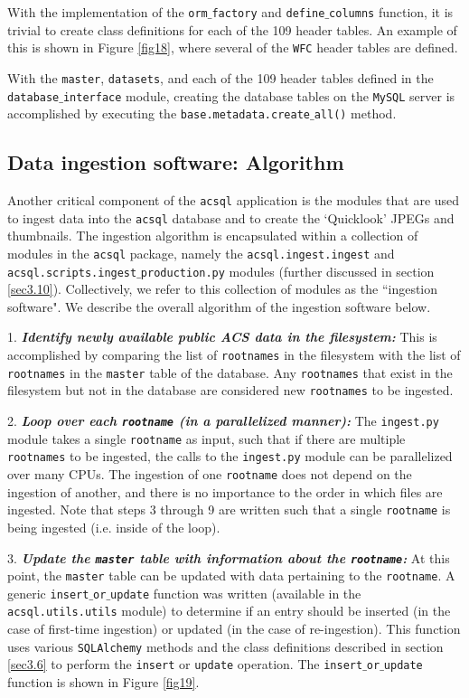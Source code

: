 \documentclass[10pt,journal,compsoc]{IEEEtran}
\begin{document}
With the implementation of the \texttt{orm$\_$factory} and \texttt{define$\_$columns} function, it is trivial to create class definitions for each of the 109 header tables.  An
example of this is shown in Figure \ref{fig18}, where several of the \texttt{WFC} header tables are defined.

With the \texttt{master}, \texttt{datasets}, and each of the 109 header tables defined in the \texttt{database$\_$interface} module, creating the database tables on the \texttt{MySQL}
server is accomplished by executing the \texttt{base.metadata.create$\_$all()} method.


\subsection{Data ingestion software: Algorithm} \label{sec3.7}

Another critical component of the \texttt{acsql} application is the modules that are used to ingest data into the \texttt{acsql} database and to create the `Quicklook' JPEGs and
thumbnails. The ingestion algorithm is encapsulated within a collection of modules in the \texttt{acsql} package, namely the \texttt{acsql.ingest.ingest} and
\texttt{acsql.scripts.ingest$\_$production.py} modules (further discussed in section \ref{sec3.10}).  Collectively, we refer to this collection of modules as the ``ingestion software".
We describe the overall algorithm of the ingestion software below.

1. \textbf{\textit{Identify newly available public ACS data in the filesystem:}}  This is accomplished by comparing the list of \texttt{rootnames} in the filesystem with the list
of \texttt{rootnames} in the \texttt{master} table of the database.  Any \texttt{rootnames} that exist in the filesystem but not in the database are considered new \texttt{rootnames} to
be ingested.

2. \textbf{\textit{Loop over each \texttt{rootname} (in a parallelized manner):}}  The \texttt{ingest.py} module takes a single \texttt{rootname} as input, such that if there are multiple
\texttt{rootnames} to be ingested, the calls to the \texttt{ingest.py} module can be parallelized over many CPUs.  The ingestion of one \texttt{rootname} does not depend on the ingestion of
another, and there is no importance to the order in which files are ingested.  Note that steps 3 through 9 are written such that a single \texttt{rootname} is being
ingested (i.e. inside of the loop).

3. \textbf{\textit{Update the \texttt{master} table with information about the \texttt{rootname}:}} At this point, the \texttt{master} table can be updated with data pertaining to the
\texttt{rootname}.  A generic \texttt{insert$\_$or$\_$update} function was written (available in the \texttt{acsql.utils.utils} module) to determine if an entry should be inserted (in the
case of first-time ingestion) or updated (in the case of re-ingestion). This function uses various \texttt{SQLAlchemy} methods and the class definitions described
in section \ref{sec3.6} to perform the \texttt{insert} or \texttt{update} operation.  The \texttt{insert$\_$or$\_$update} function is shown in Figure \ref{fig19}.
\end{document}

